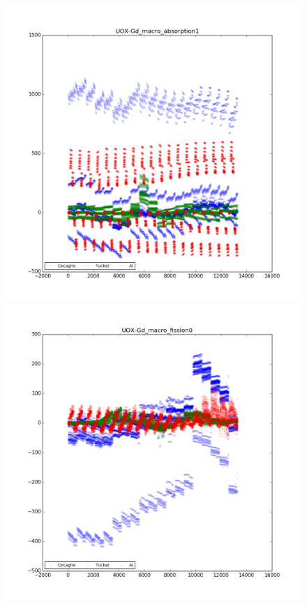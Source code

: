 \begin{center}
\begin{figure}[h]
   \begin{minipage}[b]{0.5\linewidth}
      \centering \includegraphics[scale=0.3]{images/UOX-Gd/UOX-Gd_macro_absorption1.png}
   \end{minipage}
   \begin{minipage}[b]{0.5\linewidth}
      \centering \includegraphics[scale=0.3]{images/UOX-Gd/UOX-Gd_macro_fission0.png}

\end{minipage}
\end{figure}
\end{center}
